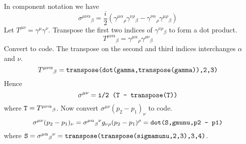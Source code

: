 \documentclass[12pt]{article}
\begin{document}
In component notation we have
$$
\sigma^{\mu\nu\alpha}{}_\beta
=\frac{i}{2}\left(\gamma^{\mu\alpha}{}_\rho\gamma^{\nu\rho}{}_\beta
-\gamma^{\nu\alpha}{}_\rho\gamma^{\mu\rho}{}_\beta\right)
$$
Let $T^{\mu\nu}=\gamma^\mu\gamma^\nu$.
Transpose the first two indices of $\gamma^{\nu\rho}{}_\beta$ to form a dot product.
$$
T^{\mu\nu\alpha}{}_\beta
=\gamma^{\mu\alpha}{}_\rho\gamma^{\rho\nu}{}_\beta
$$
Convert to code.
The transpose on the second and third indices interchanges $\alpha$ and $\nu$.
\begin{equation*}
T^{\mu\nu\alpha}{}_\beta
=\text{\tt transpose(dot(gamma,transpose(gamma)),2,3)}
\end{equation*}
Hence
\begin{equation*}
\sigma^{\mu\nu}=\text{\tt i/2 (T - transpose(T))}
\end{equation*}
where $\text{\tt T}=T^{\mu\nu\alpha}{}_\beta$.
%
Now convert $\sigma^{\mu\nu}(p_2-p_1)_\nu$ to code.
$$
\sigma^{\mu\nu}(p_2-p_1)_\nu
=\sigma^{\mu\alpha}{}_\beta{}^{\nu}g_{\nu\rho}(p_2-p_1)^\rho
=\text{\tt dot(S,gmunu,p2 - p1)}
$$
where $\text{\tt S}=\sigma^{\mu\alpha}{}_\beta{}^\nu
=\text{\tt transpose(transpose(sigmamunu,2,3),3,4)}$.

\newpage
{}
\end{document}

